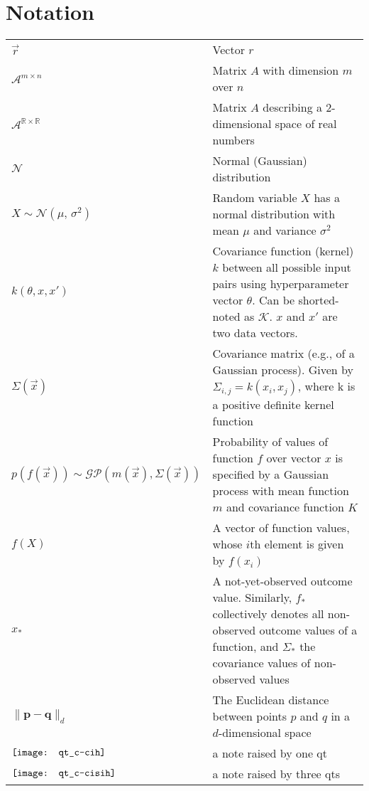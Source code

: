 \section*{Notation}
\begin{tabularx}{\linewidth}{l@{\quad}X}
	$\vec{r}$ & Vector $r$ \\
	$\mathcal{A}^{m \times n}$ & Matrix $A$ with dimension $m$ over $n$ \\
	$\mathcal{A}^{\mathbb{R} \times \mathbb{R}}$ & Matrix $A$ describing a 2-dimensional space of real numbers \\
	$\mathcal{N}$ 	&	Normal (Gaussian) distribution \\
	$X \sim \mathcal{N}(\mu,\,\sigma^{2})$	&	Random variable $X$ has a normal distribution with mean $\mu$ and variance $\sigma^{2}$ \\
	$k\left( \theta, x, x' \right)$ & Covariance function (kernel) $k$ between all possible input pairs using hyperparameter vector $\theta$. Can be shorted-noted as $\mathcal{K}$. $x$ and $x'$ are two data vectors. \\
	$\Sigma(\vec{x})$	&	Covariance matrix (e.g., of a Gaussian process). Given by $\Sigma_{i,j} = k(x_i, x_j)$, where k is a positive definite kernel function \\
	$p\left( f \left( \vec{x} \right) \right) \sim \mathcal{GP}\left( m(\vec{x}), \Sigma(\vec{x}) \right)$	&	Probability of values of function $f$ over vector $x$ is specified by a Gaussian process with mean function $m$ and covariance function $K$ \\
	$f(X)$	&	A vector of function values, whose $i$th element is given by $f(x_i)$ \\
	$x_*$	&	A not-yet-observed outcome value. Similarly, $f_*$ collectively denotes all non-observed outcome values of a function, and $\Sigma_*$ the covariance values of non-observed values \\
	$\lVert \mathbf{p - q} \rVert_d$ & The Euclidean distance between points $p$ and $q$ in a $d$-dimensional space\\
	$\vcenter{\hbox{\texttt{[image: qt\_c-cih]}}}$	& a note raised by one \acl{qt}\\
	$\vcenter{\hbox{\texttt{[image: qt\_c-cisih]}}}$	& a note raised by three \aclp{qt}\\
\end{tabularx}
  	
\newpage
